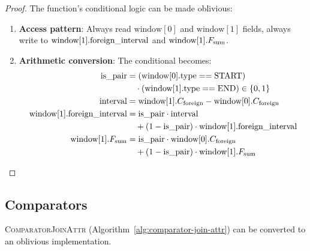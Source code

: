 \begin{proof}
The function's conditional logic can be made oblivious:
\begin{enumerate}
\item \textbf{Access pattern}: Always read $\text{window}[0]$ and $\text{window}[1]$ fields, always write to $\text{window}[1].\text{foreign\_interval}$ and $\text{window}[1].F_{\text{sum}}$.
\item \textbf{Arithmetic conversion}: The conditional becomes:
\begin{align}
\text{is\_pair} &= (\text{window}[0].\text{type} == \text{START}) \nonumber \\
&\quad \cdot (\text{window}[1].\text{type} == \text{END}) \in \{0,1\} \nonumber \\
\text{interval} &= \text{window}[1].C_{\text{foreign}} - \text{window}[0].C_{\text{foreign}} \nonumber \\
\text{window}[1].\text{foreign\_interval} &= \text{is\_pair} \cdot \text{interval} \nonumber \\
&\quad + (1 - \text{is\_pair}) \cdot \text{window}[1].\text{foreign\_interval} \nonumber \\
\text{window}[1].F_{\text{sum}} &= \text{is\_pair} \cdot \text{window}[0].C_{\text{foreign}} \nonumber \\
&\quad + (1 - \text{is\_pair}) \cdot \text{window}[1].F_{\text{sum}} \nonumber
\end{align}
\end{enumerate}
\end{proof}

\subsection{Comparators}

\begin{lemma}
\label{lem:comparator-join}
\textsc{ComparatorJoinAttr} (Algorithm~\ref{alg:comparator-join-attr}) can be converted to an oblivious implementation.
\end{lemma}

